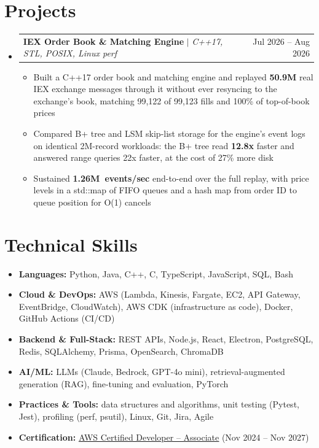 \documentclass[letterpaper,10pt]{article}
\makeatletter
\newcommand{\resumeItem}[1]{\item{#1}\vspace{-1pt}}
\newcommand{\resumeProjectHeading}[2]{%
  \item
  \begin{tabular*}{\textwidth}{l@{\extracolsep{\fill}}r}
    #1 & #2 \\
  \end{tabular*}\vspace{-6pt}%
}
\newcommand{\resumeSubHeadingListStart}{\begin{itemize}[leftmargin=0in, label={}, itemsep=0pt, topsep=2pt]}
\newcommand{\resumeSubHeadingListEnd}{\end{itemize}}
\newcommand{\resumeItemListStart}{\begin{itemize}[leftmargin=0.18in, itemsep=0pt, topsep=1pt, parsep=0pt]}
\newcommand{\resumeItemListEnd}{\end{itemize}\vspace{0pt}}
\makeatother
\begin{document}
\section{Projects}
\resumeSubHeadingListStart
  \resumeProjectHeading
    {\textbf{IEX Order Book \& Matching Engine} $|$ \textit{C++17, STL, POSIX, Linux perf}}{Jul 2026 -- Aug 2026}
  \resumeItemListStart
    \resumeItem{Built a C++17 order book and matching engine and replayed \textbf{50.9M} real IEX exchange messages through it without ever resyncing to the exchange's book, matching 99,122 of 99,123 fills and 100\% of top-of-book prices}
    \resumeItem{Compared B+ tree and LSM skip-list storage for the engine's event logs on identical 2M-record workloads: the B+ tree read \textbf{12.8x} faster and answered range queries 22x faster, at the cost of 27\% more disk}
    \resumeItem{Sustained \mbox{\textbf{1.26M events/sec}} end-to-end over the full replay, with price levels in a std::map of FIFO queues and a hash map from order ID to queue position for O(1) cancels}
  \resumeItemListEnd
\resumeSubHeadingListEnd

\section{Technical Skills}
\begin{itemize}[leftmargin=0in, label={}, itemsep=0pt, topsep=2pt]
  \small
  \item{\textbf{Languages:} Python, Java, C++, C, TypeScript, JavaScript, SQL, Bash}
  \item{\textbf{Cloud \& DevOps:} AWS (Lambda, Kinesis, Fargate, EC2, API Gateway, EventBridge, CloudWatch), AWS CDK (infrastructure as code), Docker, GitHub Actions (CI/CD)}
  \item{\textbf{Backend \& Full-Stack:} REST APIs, Node.js, React, Electron, PostgreSQL, Redis, SQLAlchemy, Prisma, OpenSearch, ChromaDB}
  \item{\textbf{AI/ML:} LLMs (Claude, Bedrock, GPT-4o mini), retrieval-augmented generation (RAG), fine-tuning and evaluation, PyTorch}
  \item{\textbf{Practices \& Tools:} data structures and algorithms, unit testing (Pytest, Jest), profiling (perf, psutil), Linux, Git, Jira, Agile}
  \item{\textbf{Certification:} \href{https://www.credly.com/badges/d2406a97-d937-47de-823b-724981159d3b/public_url}{\underline{AWS Certified Developer -- Associate}} (Nov 2024 -- Nov 2027)}
\end{itemize}
\end{document}
